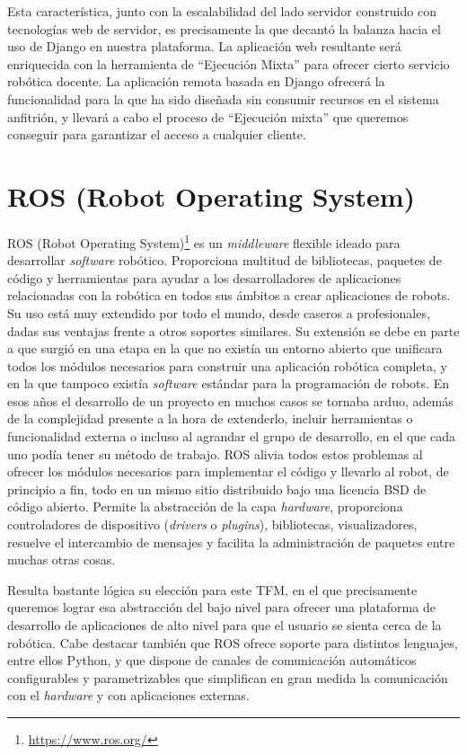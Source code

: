 Esta característica, junto con la escalabilidad del lado servidor construido con tecnologías web de servidor, es precisamente la que decantó la balanza hacia el uso de Django en nuestra plataforma. La aplicación web resultante será enriquecida con la herramienta de ``Ejecución Mixta'' para ofrecer cierto servicio robótica docente. La aplicación remota basada en Django ofrecerá la funcionalidad para la que ha sido diseñada sin consumir recursos en el sistema anfitrión, y llevará a cabo el proceso de ``Ejecución mixta'' que queremos conseguir para garantizar el acceso a cualquier cliente.

\section{ROS (Robot Operating System)}

ROS (Robot Operating System)\footnote{\url{https://www.ros.org/}} es un \textit{middleware} flexible ideado para desarrollar \textit{software} robótico. Proporciona multitud de bibliotecas, paquetes de código y herramientas para ayudar a los desarrolladores de aplicaciones relacionadas con la robótica en todos sus ámbitos a crear aplicaciones de robots. Su uso está muy extendido por todo el mundo, desde caseros a profesionales, dadas sus ventajas frente a otros soportes similares. Su extensión se debe en parte a que surgió en una etapa en la que no existía un entorno abierto que unificara todos los módulos necesarios para construir una aplicación robótica completa, y en la que tampoco existía \textit{software} estándar para la programación de robots. En esos años el desarrollo de un proyecto en muchos casos se tornaba arduo, además de la complejidad presente a la hora de extenderlo, incluir herramientas o funcionalidad externa o incluso al agrandar el grupo de desarrollo, en el que cada uno podía tener su método de trabajo. ROS alivia todos estos problemas al ofrecer los módulos necesarios para implementar el código y llevarlo al robot, de principio a fin, todo en un mismo sitio distribuido bajo una licencia BSD de código abierto. Permite la abstracción de la capa \textit{hardware}, proporciona controladores de dispositivo (\textit{drivers} o \textit{plugins}), bibliotecas, visualizadores, resuelve el intercambio de mensajes y facilita la administración de paquetes entre muchas otras cosas.

Resulta bastante lógica su elección para este TFM, en el que precisamente queremos lograr esa abstracción del bajo nivel para ofrecer una plataforma de desarrollo de aplicaciones de alto nivel para que el usuario se sienta cerca de la robótica. Cabe destacar también que ROS ofrece soporte para distintos lenguajes, entre ellos Python, y que dispone de canales de comunicación automáticos configurables y parametrizables que simplifican en gran medida la comunicación con el \textit{hardware} y con aplicaciones externas.

